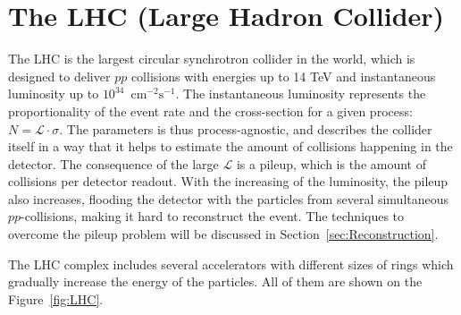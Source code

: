 \chapter{The LHC (Large Hadron Collider)}
\label{sec:LHC}

The LHC is the largest circular synchrotron collider in the world, which is designed to deliver $pp$ collisions with energies up to 14 TeV and instantaneous luminosity up to $10^{34}$~$\mathrm{cm}^{-2}\mathrm{s}^{-1}$. The instantaneous luminosity represents the proportionality of the event rate and the cross-section for a given process: $N = \mathcal{L} \cdot \sigma$. The parameters is thus process-agnostic, and describes the collider itself in a way that it helps to estimate the amount of collisions happening in the detector. The consequence of the large $\mathcal{L}$ is a pileup, which is the amount of collisions per detector readout. With the increasing of the luminosity, the pileup also increases, flooding the detector with the particles from several simultaneous $pp$-collisions, making it hard to reconstruct the event. The techniques to overcome the pileup problem will be discussed in Section~\ref{sec:Reconstruction}.

The LHC complex includes several accelerators with different sizes of rings which gradually increase the energy of the particles. All of them are shown on the Figure~\ref{fig:LHC}.

\begin{figure}
\end{figure}

